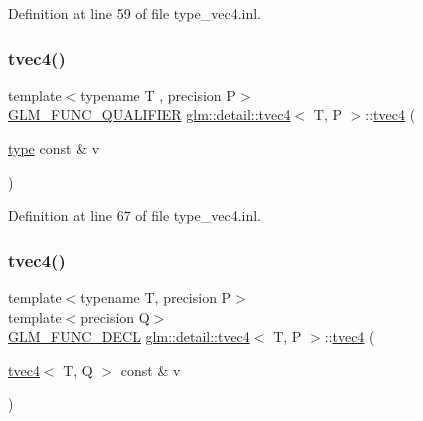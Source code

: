 Definition at line 59 of file type\+\_\+vec4.\+inl.

\mbox{\label{structglm_1_1detail_1_1tvec4_afcfdeb0b6acbd1e65de7705a0080bed0}} 
\subsubsection{\texorpdfstring{tvec4()}{tvec4()}\hspace{0.1cm}{\footnotesize\ttfamily [2/23]}}
{\footnotesize\ttfamily template$<$typename T , precision P$>$ \\
\hyperlink{setup_8hpp_a33fdea6f91c5f834105f7415e2a64407}{G\+L\+M\+\_\+\+F\+U\+N\+C\+\_\+\+Q\+U\+A\+L\+I\+F\+I\+ER} \hyperlink{structglm_1_1detail_1_1tvec4}{glm\+::detail\+::tvec4}$<$ T, P $>$\+::\hyperlink{structglm_1_1detail_1_1tvec4}{tvec4} (\begin{DoxyParamCaption}\item[{\hyperlink{structglm_1_1detail_1_1tvec4_a6f73aac80b830832bddd293627bd79b1}{type} const \&}]{v }\end{DoxyParamCaption})}



Definition at line 67 of file type\+\_\+vec4.\+inl.

\mbox{\label{structglm_1_1detail_1_1tvec4_a649d25bc38c98c9c95122a08d4eec842}} 
\subsubsection{\texorpdfstring{tvec4()}{tvec4()}\hspace{0.1cm}{\footnotesize\ttfamily [3/23]}}
{\footnotesize\ttfamily template$<$typename T, precision P$>$ \\
template$<$precision Q$>$ \\
\hyperlink{setup_8hpp_ab2d052de21a70539923e9bcbf6e83a51}{G\+L\+M\+\_\+\+F\+U\+N\+C\+\_\+\+D\+E\+CL} \hyperlink{structglm_1_1detail_1_1tvec4}{glm\+::detail\+::tvec4}$<$ T, P $>$\+::\hyperlink{structglm_1_1detail_1_1tvec4}{tvec4} (\begin{DoxyParamCaption}\item[{\hyperlink{structglm_1_1detail_1_1tvec4}{tvec4}$<$ T, Q $>$ const \&}]{v }\end{DoxyParamCaption})}

